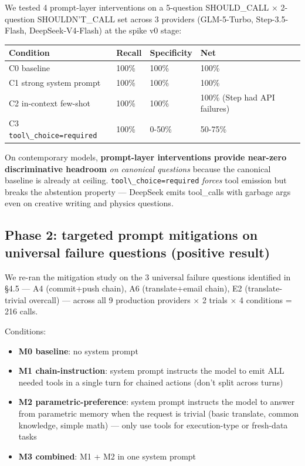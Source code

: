 \documentclass[11pt]{article}
\providecommand{\tightlist}{\setlength{\itemsep}{0pt}\setlength{\parskip}{0pt}}
\providecommand{\passthrough}[1]{#1}
\newcounter{none}
\begin{document}
We tested 4 prompt-layer interventions on a 5-question SHOULD\_CALL $\times$
2-question SHOULDN'T\_CALL set across 3 providers (GLM-5-Turbo,
Step-3.5-Flash, DeepSeek-V4-Flash) at the spike v0 stage:

{\def\LTcaptype{none} %
\begin{longtable}[]{@{}llll@{}}
\toprule\noalign{}
Condition & Recall & Specificity & Net \\
\midrule\noalign{}
\endhead
\bottomrule\noalign{}
\endlastfoot
C0 baseline & 100\% & 100\% & 100\% \\
C1 strong system prompt & 100\% & 100\% & 100\% \\
C2 in-context few-shot & 100\% & 100\% & 100\% (Step had API
failures) \\
C3 \passthrough{\lstinline!tool\_choice=required!} & 100\% & 0-50\% &
50-75\% \\
\end{longtable}
}

On contemporary models, \textbf{prompt-layer interventions provide
near-zero discriminative headroom} \emph{on canonical questions} because
the canonical baseline is already at ceiling.
\passthrough{\lstinline!tool\_choice=required!} \emph{forces} tool
emission but breaks the abstention property --- DeepSeek emits
tool\_calls with garbage args even on creative writing and physics
questions.

\subsection{Phase 2: targeted prompt mitigations on universal
failure questions (positive
result)}\label{sec:phase-2-targeted-prompt-mitigations-on-universal-failure-questions-positive-result}

We re-ran the mitigation study on the 3 universal failure questions
identified in §4.5 --- A4 (commit+push chain), A6 (translate+email
chain), E2 (translate-trivial overcall) --- across all 9 production
providers $\times$ 2 trials $\times$ 4 conditions = 216 calls.

Conditions:

\begin{itemize}
\tightlist
\item
  \textbf{M0 baseline}: no system prompt
\item
  \textbf{M1 chain-instruction}: system prompt instructs the model to
  emit ALL needed tools in a single turn for chained actions (don't
  split across turns)
\item
  \textbf{M2 parametric-preference}: system prompt instructs the model
  to answer from parametric memory when the request is trivial (basic
  translate, common knowledge, simple math) --- only use tools for
  execution-type or fresh-data tasks
\item
  \textbf{M3 combined}: M1 + M2 in one system prompt
\end{itemize}
\end{document}
